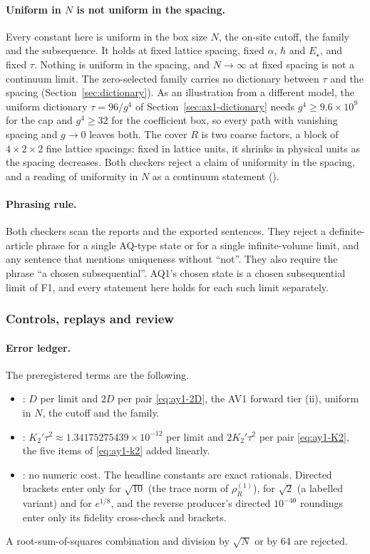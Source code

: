 \paragraph{Uniform in \texorpdfstring{$N$}{N} is not uniform in the spacing.}
Every constant here is uniform in the box size $N$, the on-site cutoff, the
family and the subsequence. It holds at fixed lattice spacing, fixed $\alpha$,
$\hbar$ and $E_\star$, and fixed $\tau$. Nothing is uniform in the spacing,
and $N\to\infty$ at fixed spacing is not a continuum limit. The zero-selected
family carries no dictionary between $\tau$ and the spacing
(Section~\ref{sec:dictionary}). As an illustration from a different model,
the uniform dictionary $\tau=96/g^4$ of Section~\ref{sec:ax1-dictionary}
needs $g^4\ge9.6\times10^9$ for the cap and $g^4\ge32$ for the coefficient
box, so every path with vanishing spacing and $g\to0$ leaves both. The cover
$R$ is two coarse factors, a block of $4\times2\times2$ fine lattice spacings:
fixed in lattice units, it shrinks in physical units as the spacing
decreases. Both checkers reject a claim of uniformity in the spacing, and a
reading of uniformity in $N$ as a continuum statement
().

\paragraph{Phrasing rule.}
Both checkers scan the reports and the exported sentences. They reject a
definite-article phrase for a single AQ-type state or for a single
infinite-volume limit, and any sentence that mentions uniqueness without
``not''. They also require the phrase ``a chosen subsequential''. AQ1's chosen
state is a chosen subsequential limit of F1, and every statement here holds
for each such limit separately.

\subsubsection{Controls, replays and review}
\label{sec:ay1-evidence}
\paragraph{Error ledger.}
The preregistered terms are the following.
\begin{itemize}
\item {}: $D$ per limit and $2D$ per pair
 \eqref{eq:ay1-2D}, the AV1 forward tier (ii), uniform in $N$, the cutoff and
 the family.
\item {}: $K_2'\tau^2\approx1.34175275439\times10^{-12}$
 per limit and $2K_2'\tau^2$ per pair \eqref{eq:ay1-K2}, the five items of
 \eqref{eq:ay1-k2} added linearly.
\item {}: no numeric cost. The headline constants are exact
 rationals. Directed brackets enter only for $\sqrt{10}$ (the trace norm of
 $\rho^{(1)}_R$), for $\sqrt2$ (a labelled variant) and for $e^{1/8}$, and the
 reverse producer's directed $10^{-40}$ roundings enter only its fidelity
 cross-check and brackets.
\end{itemize}
A root-sum-of-squares combination and division by $\sqrt N$ or by 64 are
rejected.

